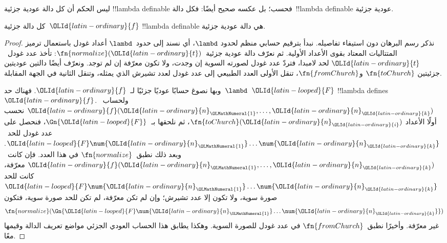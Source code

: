 \documentclass[../../../include/open-logic-section]{subfiles}
\begin{document}

ليس الحكم أن كل دالة عودية جزئية !!{lambda definable} فحسب؛ بل عكسه
صحيح أيضًا: فكل دالة~!!{lambda definable} عودية جزئية.

\begin{thm}
   كل دالة جزئية~${\OLId{latin-ordinary}{f}}$
  !!{lambda definable} هي دالة عودية جزئية.
\end{thm}

\begin{proof}
  نذكر رسم البرهان دون استيفاء تفاصيله. نبدأ بترقيم حسابي منظم لحدود
  $\lambd$، أي نسند إلى حدود~$\lambd$ أعداد غودل باستعمال ترميز المتتاليات المعتاد
  بقوى الأعداد الأولية. ثم نعرّف دالة عودية جزئية~$\fn{normalize}({\OLId{latin-ordinary}{t}})$:
  تأخذ عدد غودل~${\OLId{latin-ordinary}{t}}$ لحد لامبدا، فتردّ عدد غودل لصورته السوية إن وجدت،
  ولا تكون معرّفة إن لم توجد. ونعرّف أيضًا دالتين عوديتين جزئيتين
  $\fn{toChurch}$ و$\fn{fromChurch}$، تنقل الأولى العدد الطبيعي إلى
  عدد غودل لعدد تشيرش الذي يمثله، وتنقل الثانية في الجهة المقابلة.

  وبها نصوغ حسابًا عوديًا جزئيًا لـ~${\OLId{latin-ordinary}{f}}$. فهناك حد~$\lambd$~${\OLId{latin-looped}{F}}$
  !!{lambda define}s~${\OLId{latin-ordinary}{f}}$. ولحساب~${\OLId{latin-ordinary}{f}}({\OLId{latin-ordinary}{n}}_{\OLMathNumeral{1}}, \dots, {\OLId{latin-ordinary}{n}}_{\OLId{latin-ordinary}{k}})$ نحسب أولًا الأعداد
  $\fn{toChurch}({\OLId{latin-ordinary}{n}}_{\OLId{latin-ordinary}{i}})$، ثم نلحقها بـ~$\Gn{{\OLId{latin-looped}{F}}}$، فنحصل على عدد غودل
  للحد~${\OLId{latin-looped}{F}} \num{{\OLId{latin-ordinary}{n}}_{\OLMathNumeral{1}}}\dots\num{{\OLId{latin-ordinary}{n}}_{\OLId{latin-ordinary}{k}}}$. وبعد ذلك نطبق~$\fn{normalize}$
  في هذا العدد. فإن كانت~${\OLId{latin-ordinary}{f}}({\OLId{latin-ordinary}{n}}_{\OLMathNumeral{1}}, \dots, {\OLId{latin-ordinary}{n}}_{\OLId{latin-ordinary}{k}})$ معرّفة، كانت للحد
  ${\OLId{latin-looped}{F}} \num{{\OLId{latin-ordinary}{n}}_{\OLMathNumeral{1}}}\dots\num{{\OLId{latin-ordinary}{n}}_{\OLId{latin-ordinary}{k}}}$ صورة سوية، ولا تكون إلا عدد تشيرش؛
  وإن لم تكن معرّفة، لم تكن للحد صورة سوية، فتكون
  \[\fn{normalize}(\Gn{{\OLId{latin-looped}{F}}\num{{\OLId{latin-ordinary}{n}}_{\OLMathNumeral{1}}}\dots\num{{\OLId{latin-ordinary}{n}}_{\OLId{latin-ordinary}{k}}}})\]
  غير معرّفة. وأخيرًا نطبق~$\fn{fromChurch}$ في عدد غودل للصورة
  السوية. وهكذا يطابق هذا الحساب العودي الجزئي مواضع تعريف الدالة
  وقيمها معًا.
\end{proof}
\end{document}
